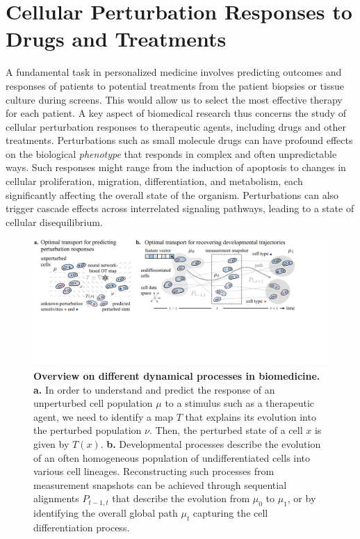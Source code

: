 \section{Cellular Perturbation Responses to Drugs and Treatments}
\label{sec:cell_perturbation_responses}

A fundamental task in personalized medicine involves predicting outcomes and responses of patients to potential treatments from the patient biopsies or tissue culture during screens. This would allow us to select the most effective therapy for each patient.
A key aspect of biomedical research thus concerns the study of cellular perturbation responses to therapeutic agents, including drugs and other treatments.
Perturbations such as small molecule drugs can have profound effects on the biological \emph{phenotype} that responds in complex and often unpredictable ways.
Such responses might range from the induction of apoptosis to changes in cellular proliferation, migration, differentiation, and metabolism, each significantly affecting the overall state of the organism. 
Perturbations can also trigger cascade effects across interrelated signaling pathways, leading to a state of cellular disequilibrium.

\begin{figure}[t]
  \includegraphics[width=\textwidth]{figures/fig_bio_problems.pdf}
  \caption{\textbf{Overview on different dynamical processes in biomedicine.} \textbf{a.} In order to understand and predict the response of an unperturbed cell population $\mu$ to a stimulus such as a therapeutic agent, we need to identify a map $T$ that explains its evolution into the perturbed population $\nu$. Then, the perturbed state of a cell $x$ is given by $T(x)$.  \textbf{b.} Developmental processes describe the evolution of an often homogeneous population of undifferentiated cells into various cell lineages. Reconstructing such processes from measurement snapshots can be achieved through sequential alignments $P_{t-1,t}$ that describe the evolution from $\mu_0$ to $\mu_1$, or by identifying the overall global path $\mu_t$ capturing the cell differentiation process.}
  \label{fig:bio_problems}
\end{figure}

